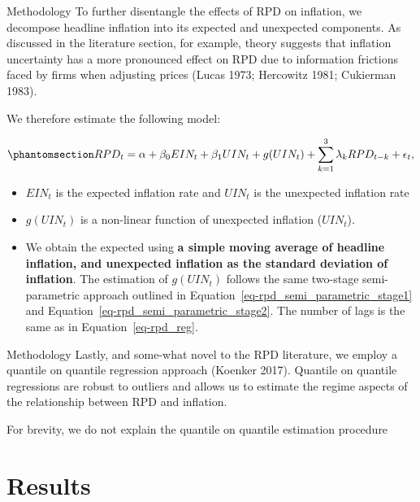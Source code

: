 \documentclass[
  ignorenonframetext,
]{beamer}
\providecommand{\tightlist}{%
  \setlength{\itemsep}{0pt}\setlength{\parskip}{0pt}}\usepackage{longtable,booktabs,array}
\begin{document}
\begin{frame}{Methodology}
\label{methodology-9}
To further disentangle the effects of RPD on inflation, we decompose
headline inflation into its expected and unexpected components. As
discussed in the literature section, for example, theory suggests that
inflation uncertainty has a more pronounced effect on RPD due to
information frictions faced by firms when adjusting prices (Lucas 1973;
Hercowitz 1981; Cukierman 1983).

We therefore estimate the following model:

\begin{equation}\phantomsection\label{eq-unexpected}{ RPD_t = \alpha + \beta_0 EIN_t + \beta_1 UIN_t + g(UIN_t) + \sum_{k=1}^{3}\lambda_k RPD_{t-k} + \epsilon_t, }\end{equation}

\begin{itemize}
\tightlist
\item
  \(EIN_t\) is the expected inflation rate and \(UIN_t\) is the
  unexpected inflation rate
\item
  \(g(UIN_t)\) is a non-linear function of unexpected inflation
  (\(UIN_t\)).
\item
  We obtain the expected using \textbf{a simple moving average of
  headline inflation, and unexpected inflation as the standard deviation
  of inflation}. The estimation of \(g(UIN_t)\) follows the same
  two-stage semi-parametric approach outlined in
  Equation~\ref{eq-rpd_semi_parametric_stage1} and
  Equation~\ref{eq-rpd_semi_parametric_stage2}. The number of lags is
  the same as in Equation~\ref{eq-rpd_reg}.
\end{itemize}
\end{frame}

\begin{frame}{Methodology}
\label{methodology-10}
Lastly, and some-what novel to the RPD literature, we employ a quantile
on quantile regression approach (Koenker 2017). Quantile on quantile
regressions are robust to outliers and allows us to estimate the regime
aspects of the relationship between RPD and inflation.

For brevity, we do not explain the quantile on quantile estimation
procedure
\end{frame}

\section{Results}\label{results}
\end{document}
